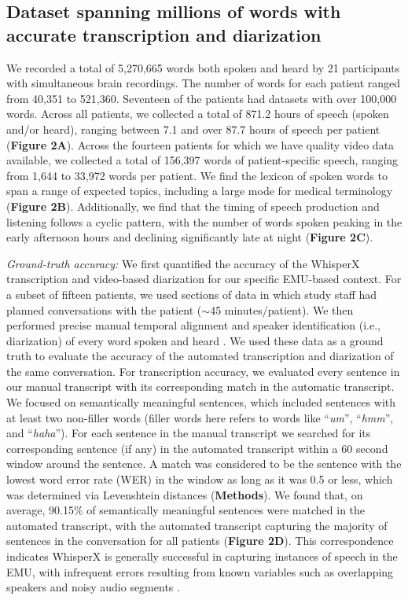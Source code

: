 \documentclass[pdflatex,sn-basic]{sn-jnl}%
\theoremstyle{thmstyleone}%
\theoremstyle{thmstyletwo}%
\theoremstyle{thmstylethree}%
\begin{document}
\clearpage
\subsection{Dataset spanning millions of words with accurate transcription and diarization}

We recorded a total of 5{,}270{,}665 words both spoken and heard by 21 participants with simultaneous brain recordings. The number of words for each patient ranged from 40{,}351 to 521{,}360. Seventeen of the patients had datasets with over 100{,}000 words. Across all patients, we collected a total of 871.2 hours of speech (spoken and/or heard), ranging between 7.1 and over 87.7 hours of speech per patient (\textbf{Figure 2A}). Across the fourteen patients for which we have quality video data available, we collected a total of 156{,}397 words of patient-specific speech, ranging from 1{,}644 to 33{,}972 words per patient. We find the lexicon of spoken words to span a range of expected topics, including a large mode for medical terminology (\textbf{Figure 2B}). Additionally, we find that the timing of speech production and listening follows a cyclic pattern, with the number of words spoken peaking in the early afternoon hours and declining significantly late at night (\textbf{Figure 2C}).

\textit{Ground-truth accuracy:} We first quantified the accuracy of the WhisperX transcription and video-based diarization for our specific EMU-based context. For a subset of fifteen patients, we used sections of data in which study staff had planned conversations with the patient ($\sim$45 minutes/patient). We then performed precise manual temporal alignment and speaker identification (i.e., diarization) of every word spoken and heard \citep{bib53}. We used these data as a ground truth to evaluate the accuracy of the automated transcription and diarization of the same conversation. For transcription accuracy, we evaluated every sentence in our manual transcript with its corresponding match in the automatic transcript. We focused on semantically meaningful sentences, which included sentences with at least two non-filler words (filler words here refers to words like ``\textit{um}'', ``\textit{hmm}'', and ``\textit{haha}''). For each sentence in the manual transcript we searched for its corresponding sentence (if any) in the automated transcript within a 60 second window around the sentence. A match was considered to be the sentence with the lowest word error rate (WER) in the window as long as it was 0.5 or less, which was determined via Levenshtein distances \citep{bib115} (\textbf{Methods}). We found that, on average, 90.15\% of semantically meaningful sentences were matched in the automated transcript, with the automated transcript capturing the majority of sentences in the conversation for all patients (\textbf{Figure 2D}). This correspondence indicates WhisperX is generally successful in capturing instances of speech in the EMU, with infrequent errors resulting from known variables such as overlapping speakers and noisy audio segments \citep{bib39}.
\end{document}
